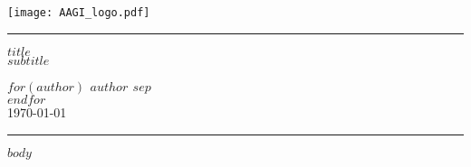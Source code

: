 \documentclass{scrartcl}
\begin{document}
	
	\begin{titlepage}
		
		\thispagestyle{Title_page}
		
		\vspace*{-2cm}
		
		\begin{center}
			\texttt{[image: AAGI\_logo.pdf]}
		\end{center}
		
		\vfill
		
		\rule{\textwidth}{0.5pt}
		
		\begin{FlushRight}
			
			\huge
			\textcolor{aagiteal}{\textbf{$title$}}\\[6mm]
			
			\large
			{\textbf{$subtitle$}}\\[5mm]
			\vspace{2mm}
			
			\normalsize
			\textbf{$for(author)$
					$author$
					$sep$ \\[8mm]
					$endfor$}\\[8mm]

    		\today
  \end{FlushRight}

  \rule{\textwidth}{0.5pt}

  \vfill
		
	\end{titlepage}

	\newpage
	
	\tableofcontents
	
	\newpage
	
	$body$
	
\end{document}
